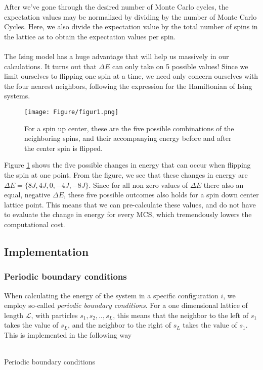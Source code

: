 After we've gone through the desired number of Monte Carlo cycles, the expectation values may be normalized by dividing by the number of Monte Carlo Cycles. Here, we also divide the expectation value by the total number of spins in the lattice as to obtain the expectation values per spin.\\ \\
The Ising model has a huge advantage that will help us massively in our calculations. It turns out that $\Delta E$ can only take on 5 possible values! Since we limit ourselves to flipping one spin at a time, we need only concern ourselves with the four nearest neighbors, following the expression for the Hamiltonian of Ising systems.
\begin{figure}[H]
    \centering
    \texttt{[image: Figure/figur1.png]}
    \caption{For a spin up center, these are the five possible combinations of the neighboring spins, and their accompanying energy before and after the center spin is flipped.}
    \label{fig:deltae}
\end{figure}
Figure \ref{fig:deltae} shows the five possible changes in energy that can occur when flipping the spin at one point. From the figure, we see that these changes in energy are $\Delta E = \{8J, 4J, 0, -4J, -8J\}$. Since for all non zero values of $\Delta E$ there also an equal, negative $\Delta E$, these five possible outcomes also holds for a spin down center lattice point. This means that we can pre-calculate these values, and do not have to evaluate the change in energy for every MCS, which tremendously lowers the computational cost.

\subsection{Implementation}
\subsubsection{Periodic boundary conditions}
When calculating the energy of the system in a specific configuration $i$, we employ so-called \textit{periodic boundary conditions}. For a one dimensional lattice of length $\mathcal{L}$, with particles $s_1, s_2,..,s_L$, this means that the neighbor to the left of $s_1$ takes the value of $s_L$, and the neighbor to the right of $s_L$ takes the value of $s_1$. This is implemented in the following way\\ \\
\begin{algorithm}[H]
		\caption{Periodic boundary conditions}
		\label{periodic}
		\SetAlgoLined
\end{algorithm}

